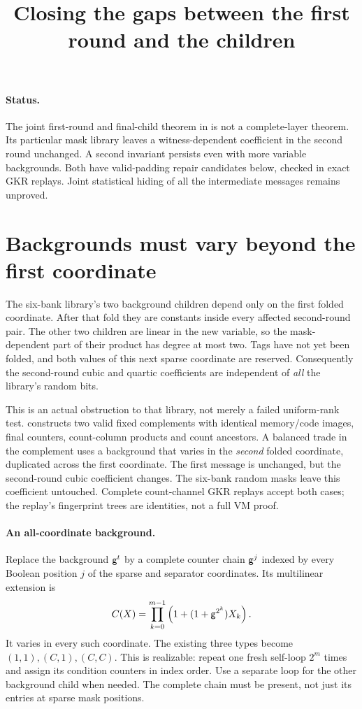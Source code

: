 \documentclass[11pt]{article}
\title{Closing the gaps between the first round and the children}
\author{}
\date{}
\begin{document}
\maketitle
\vspace{-2em}

\paragraph{Status.} The joint first-round and final-child theorem in  is not a complete-layer theorem. Its particular mask library leaves a witness-dependent coefficient in the second round unchanged. A second invariant persists even with more variable backgrounds. Both have valid-padding repair candidates below, checked in exact GKR replays. Joint statistical hiding of all the intermediate messages remains unproved.

\section{Backgrounds must vary beyond the first coordinate}

The six-bank library's two background children depend only on the first folded coordinate. After that fold they are constants inside every affected second-round pair. The other two children are linear in the new variable, so the mask-dependent part of their product has degree at most two. Tags have not yet been folded, and both values of this next sparse coordinate are reserved. Consequently the second-round cubic and quartic coefficients are independent of \emph{all} the library's random bits.

This is an actual obstruction to that library, not merely a failed uniform-rank test.  constructs two valid fixed complements with identical memory/code images, final counters, count-column products and count ancestors. A balanced trade in the complement uses a background that varies in the \emph{second} folded coordinate, duplicated across the first coordinate. The first message is unchanged, but the second-round cubic coefficient changes. The six-bank random masks leave this coefficient untouched. Complete count-channel GKR replays accept both cases; the replay's fingerprint trees are identities, not a full VM proof.

\paragraph{An all-coordinate background.} Replace the background $\mathsf{g}^t$ by a complete counter chain $\mathsf{g}^j$ indexed by every Boolean position $j$ of the sparse and separator coordinates. Its multilinear extension is
\[
 C(X)=\prod_{k=0}^{m-1}\left(1+(1+\mathsf{g}^{2^k})X_k\right).
\]
It varies in every such coordinate. The existing three types become $(1,1),(C,1),(C,C)$. This is realizable: repeat one fresh self-loop $2^m$ times and assign its condition counters in index order. Use a separate loop for the other background child when needed. The complete chain must be present, not just its entries at sparse mask positions.
\end{document}
